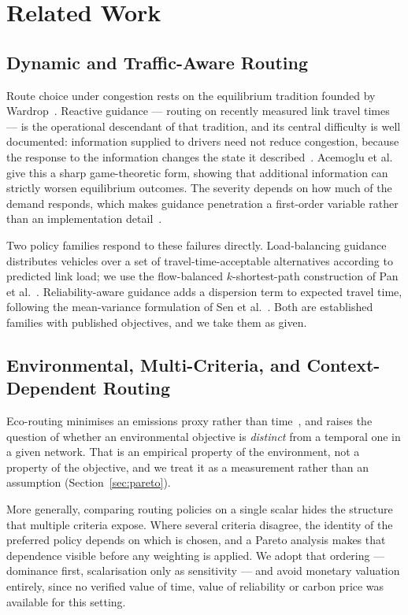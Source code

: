 \section{Related Work}

\subsection{Dynamic and Traffic-Aware Routing}

Route choice under congestion rests on the equilibrium tradition founded by
Wardrop~\cite{wardrop1952}. Reactive guidance --- routing on recently measured
link travel times --- is the operational descendant of that tradition, and its
central difficulty is well documented: information supplied to drivers need not
reduce congestion, because the response to the information changes the state
it described~\cite{arnott1991information}. Acemoglu et al.~\cite{acemoglu2018braess}
give this a sharp game-theoretic form, showing that additional information can
strictly worsen equilibrium outcomes. The severity depends on how much of the
demand responds, which makes guidance penetration a first-order variable rather
than an implementation detail~\cite{yang1998penetration}.

Two policy families respond to these failures directly. Load-balancing guidance
distributes vehicles over a set of travel-time-acceptable alternatives according
to predicted link load; we use the flow-balanced $k$-shortest-path construction
of Pan et al.~\cite{pan2013proactive}. Reliability-aware guidance adds a
dispersion term to expected travel time, following the mean-variance
formulation of Sen et al.~\cite{sen2001meanvariance}. Both are established
families with published objectives, and we take them as given.

\subsection{Environmental, Multi-Criteria, and Context-Dependent Routing}

Eco-routing minimises an emissions proxy rather than
time~\cite{boriboonsomsin2012eco}, and raises the question of whether an
environmental objective is \emph{distinct} from a temporal one in a given
network. That is an empirical property of the environment, not a property of
the objective, and we treat it as a measurement rather than an assumption
(Section~\ref{sec:pareto}).

More generally, comparing routing policies on a single scalar hides the
structure that multiple criteria expose. Where several criteria disagree, the
identity of the preferred policy depends on which is chosen, and a Pareto
analysis makes that dependence visible before any weighting is applied. We
adopt that ordering --- dominance first, scalarisation only as sensitivity ---
and avoid monetary valuation entirely, since no verified value of time, value
of reliability or carbon price was available for this setting.

